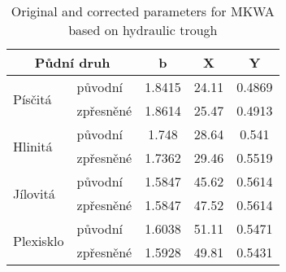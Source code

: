 
\begin{table}[htbp]
  \centering
  \caption{Original and corrected parameters for MKWA based on hydraulic trough}
    \label{tab:puvodni}%
    \begin{tabular}{llccc}
    \hline 
    
	\multicolumn{2}{c}{Půdní druh} & \multicolumn{1}{c}{b} & \multicolumn{1}{c}{X} & \multicolumn{1}{c}{Y} \\
    \hline    
    \hline
	\multirow{2}[0]{*}{Písčitá} & původní & 1.8415 & 24.11 & 0.4869 \\
      & zpřesněné & 1.8614 & 25.47 & 0.4913 \\
          \hline
	\multirow{2}[0]{*}{Hlinitá} & původní & 1.748 & 28.64 & 0.541 \\
      & zpřesněné & 1.7362 & 29.46 & 0.5519 \\
          \hline
	\multirow{2}[0]{*}{Jílovitá} & původní & 1.5847 & 45.62 & 0.5614 \\
      & zpřesněné & 1.5847 & 47.52 & 0.5614 \\
          \hline
	\multirow{2}[0]{*}{Plexisklo} & původní & 1.6038 & 51.11 & 0.5471 \\
      & zpřesněné & 1.5928 & 49.81 & 0.5431 \\
          \hline
    \end{tabular}%

\end{table}%
